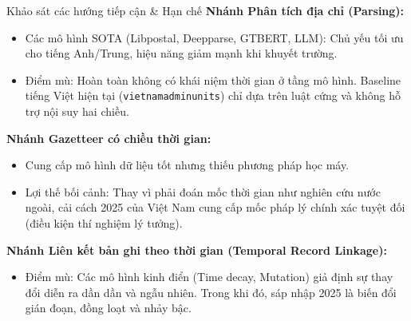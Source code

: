 \documentclass[aspectratio=169,9pt]{beamer}
\begin{document}
\begin{frame}{Khảo sát các hướng tiếp cận \& Hạn chế}
  \textbf{Nhánh Phân tích địa chỉ (Parsing):}
  \begin{itemize}
    \setlength{\itemsep}{2.5pt}
    \item Các mô hình SOTA (Libpostal, Deepparse, GTBERT, LLM): Chủ yếu tối ưu cho tiếng Anh/Trung, hiệu năng giảm mạnh khi khuyết trường.
    \item Điểm mù: Hoàn toàn không có khái niệm thời gian ở tầng mô hình. Baseline tiếng Việt hiện tại (\texttt{vietnamadminunits}) chỉ dựa trên luật cứng và không hỗ trợ nội suy hai chiều.
  \end{itemize}

  \vspace{0.15cm}
  \textbf{Nhánh Gazetteer có chiều thời gian:}
  \begin{itemize}
    \setlength{\itemsep}{2.5pt}
    \item Cung cấp mô hình dữ liệu tốt nhưng thiếu phương pháp học máy.
    \item Lợi thế bối cảnh: Thay vì phải đoán mốc thời gian như nghiên cứu nước ngoài, cải cách 2025 của Việt Nam cung cấp mốc pháp lý chính xác tuyệt đối (điều kiện thí nghiệm lý tưởng).
  \end{itemize}

  \vspace{0.15cm}
  \textbf{Nhánh Liên kết bản ghi theo thời gian (Temporal Record Linkage):}
  \begin{itemize}
    \setlength{\itemsep}{2.5pt}
    \item Điểm mù: Các mô hình kinh điển (Time decay, Mutation) giả định sự thay đổi diễn ra dần dần và ngẫu nhiên. Trong khi đó, sáp nhập 2025 là biến đổi gián đoạn, đồng loạt và nhảy bậc.
  \end{itemize}
\end{frame}
\end{document}
